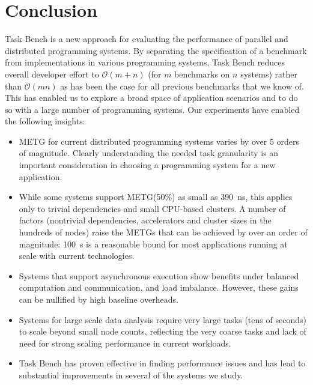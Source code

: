 \section{Conclusion}
\label{sec:conclusion}

Task Bench is a new approach for evaluating the performance of
parallel and distributed programming systems. By separating the
specification of a benchmark from implementations in various
programming systems, Task Bench reduces overall developer effort to
$\mathcal{O}(m + n)$ (for $m$ benchmarks on $n$ systems) rather than
$\mathcal{O}(mn)$ as has been the case for all previous
benchmarks that we know of. This has enabled us to explore a broad space of
application scenarios and to do so with a large number of programming
systems. Our experiments have enabled the following
insights:

\begin{itemize}

\item METG for current distributed programming systems varies by over
  5 orders of magnitude.  Clearly understanding the needed task
  granularity is an important consideration in choosing a programming
  system for a new application.

\item While some systems support METG(50\%) as small as 390~ns, this applies only to trivial dependencies and small CPU-based clusters. A number of factors (nontrivial dependencies, accelerators and cluster sizes in the hundreds of nodes) raise
  the METGs that can be achieved by over an order of magnitude: 100~\textmu{}s is a reasonable bound for most applications running at scale with current technologies.

\item Systems that support asynchronous execution show benefits under
  balanced computation
  and communication, and load imbalance. However, these gains can be nullified by
  high baseline overheads.

\item Systems for large scale data analysis require very large tasks
  (tens of seconds) to scale beyond small node counts,
  reflecting the very coarse tasks and lack of need for strong scaling
  performance in current workloads.

\item Task Bench has proven effective in finding performance issues
  and has lead to substantial improvements in several of the systems
  we study.

\end{itemize}

